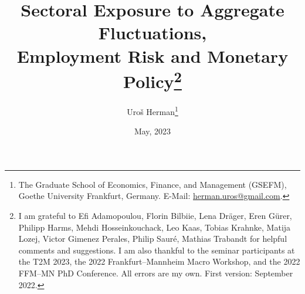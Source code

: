 \documentclass[12pt, a4paper]{article}
\begin{document}
\title{Sectoral Exposure to Aggregate Fluctuations,   \\
Employment Risk and Monetary Policy\thanks{I am grateful to Efi Adamopoulou, Florin Bilbiie, Lena Dr{\"a}ger, Eren G{\"u}rer, Philipp Harms, Mehdi Hosseinkouchack, Leo Kaas, Tobias Krahnke, Matija Lozej, Victor Gimenez Perales, Philip Sauré, Mathias Trabandt for helpful comments and suggestions. I am also thankful to the seminar participants at the T2M 2023, the 2022 Frankfurt--Mannheim Macro Workshop, and the 2022 FFM--MN PhD Conference.  All errors are my own. First version: September 2022.
}
\vspace{.5cm}
}

\author{\large{Uro\v{s} Herman}\thanks{%
The Graduate School of Economics, Finance, and Management (GSEFM), Goethe University Frankfurt, Germany. E-Mail: \href{mailto:herman.uros@gmail.com}{herman.uros@gmail.com}. 
} 
\vspace{-0.1cm}
\date{\vspace{-0.2cm} May, 2023 \\ %
\vspace{0.5cm}
	}
}

\maketitle
\end{document}
